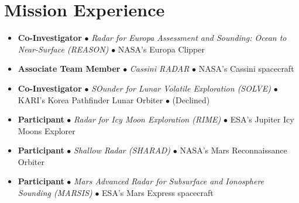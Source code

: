 \section*{Mission Experience}

\begin{itemize}[leftmargin=0em,listparindent=5.5em]
    \setlength\itemsep{.1em}
    \item[] \textbf{Co-Investigator} $\bullet$ \textit{Radar for Europa Assessment and Sounding: Ocean to Near-Surface (REASON)} $\bullet$ NASA's Europa Clipper
    \vspace{-.5em}
    \item[] \textbf{Associate Team Member} $\bullet$ \textit{Cassini RADAR} $\bullet$ NASA's Cassini spacecraft
    \vspace{-.5em}
    \item[] \textbf{Co-Investigator} $\bullet$ \textit{SOunder for Lunar Volatile Exploration (SOLVE)} $\bullet$ KARI's Korea Pathfinder Lunar Orbiter $\bullet$ (Declined)
    \vspace{-.5em}
    \item[] \textbf{Participant} $\bullet$ \textit{Radar for Icy Moon Exploration (RIME)} $\bullet$ ESA's Jupiter Icy Moons Explorer
    \vspace{-.5em}
    \item[] \textbf{Participant} $\bullet$ \textit{Shallow Radar (SHARAD)} $\bullet$ NASA's Mars Reconnaissance Orbiter
    \vspace{-.5em}
    \item[] \textbf{Participant} $\bullet$ \textit{Mars Advanced Radar for Subsurface and Ionosphere Sounding (MARSIS)} $\bullet$ ESA's Mars Express spacecraft
\end{itemize}